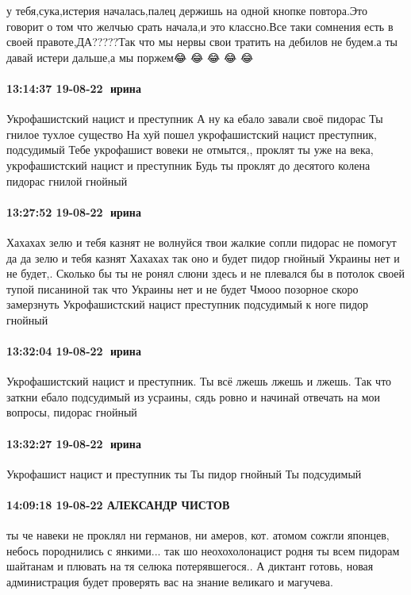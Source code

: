 у тебя,сука,истерия началась,палец держишь на одной кнопке повтора.Это говорит
о том что желчью срать начала,и это классно.Все таки сомнения есть в своей
правоте,ДА?????Так что мы нервы свои тратить на дебилов не будем.а ты давай
истери дальше,а мы поржем😂 😂 😂 😂 😂

\paragraph{13:14:37 19-08-22 🍏ирина 🍇🍇}

Укрофашистский нацист и преступник
А ну ка ебало завали своё пидорас
Ты гнилое тухлое существо
На хуй пошел укрофашистский нацист преступник, подсудимый
Тебе укрофашист вовеки не отмытся,, проклят ты уже на века, укрофашистский нацист и преступник
Будь ты проклят до десятого колена пидорас гнилой гнойный

\paragraph{13:27:52 19-08-22 🍏ирина 🍇🍇}

Хахахах зелю и тебя казнят не волнуйся твои жалкие сопли пидорас не помогут да да зелю и тебя казнят
Хахахах так оно и будет пидор гнойный
Украины нет и не будет,.
Сколько бы ты не ронял слюни здесь и не плевался бы в потолок своей тупой писаниной так что
Украины нет и не будет
Чмооо позорное скоро замерзнуть
Укрофашистский нацист преступник подсудимый к ноге пидор гнойный

\paragraph{13:32:04 19-08-22 🍏ирина 🍇🍇}

Укрофашистский нацист и преступник.
Ты всё лжешь лжешь и лжешь.
Так что заткни ебало подсудимый из усраины, сядь ровно и начинай отвечать на мои вопросы, пидорас гнойный

\paragraph{13:32:27 19-08-22 🍏ирина 🍇🍇}

Укрофашист нацист и преступник ты
Ты пидор гнойный
Ты подсудимый

\paragraph{14:09:18 19-08-22 АЛЕКСАНДР ЧИСТОВ}

ты че навеки не проклял ни германов, ни амеров, кот. атомом сожгли японцев,
небось породнились с янкими... так шо неохохолонацист родня ты всем пидорам
шайтанам и плювать на тя селюка потерявшегося.. А диктант готовь, новая
администрация будет проверять вас на знание великаго и магучева.
